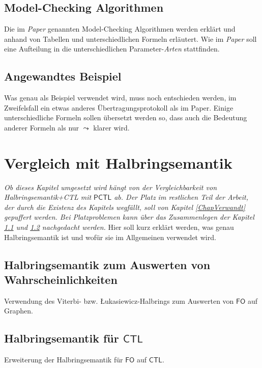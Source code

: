 \documentclass{lni}
\newcommand{\CTL}{\mathsf{CTL}}
\newcommand{\PCTL}{\mathsf{PCTL}}
\begin{document}
\subsection{Model-Checking Algorithmen}

Die im \emph{Paper} genannten Model-Checking Algorithmen werden erklärt und anhand von Tabellen und unterschiedlichen Formeln erläutert.
Wie im \emph{Paper} soll eine Aufteilung in die unterschiedlichen Parameter-\textit{Arten} stattfinden.

\subsection{Angewandtes Beispiel}

Was genau als Beispiel verwendet wird, muss noch entschieden werden, im Zweifelsfall ein etwas anderes Übertragungsprotokoll als im Paper.
Einige unterschiedliche Formeln sollen übersetzt werden so, dass auch die Bedeutung anderer Formeln als nur $\leadsto$ klarer wird.

\section{Vergleich mit Halbringsemantik}

\emph{Ob dieses Kapitel umgesetzt wird hängt von der Vergleichbarkeit von Halbringsemantik+CTL mit $\PCTL$ ab. Der Platz im restlichen Teil der Arbeit, der durch die Existenz des Kapitels wegfällt, soll von Kapitel \ref{ChapVerwandt} gepuffert werden. Bei Platzproblemen kann über das Zusammenlegen der Kapitel \ref{HalbringFO} und \ref{HalbringCTL} nachgedacht werden.} 
Hier soll kurz erklärt werden, was genau Halbringsemantik ist und wofür sie im Allgemeinen verwendet wird.

\subsection{Halbringsemantik zum Auswerten von Wahrscheinlichkeiten}
\label{HalbringFO}

Verwendung des Viterbi- bzw. \L ukasiewicz-Halbrings zum Auswerten von $\mathsf{FO}$ auf Graphen.

\subsection{Halbringsemantik für $\CTL$}
\label{HalbringCTL}

Erweiterung der Halbringsemantik für $\mathsf{FO}$ auf $\CTL$.
\end{document}
